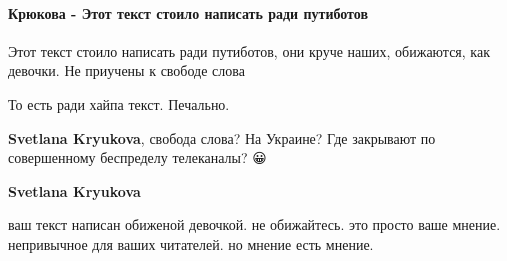  
 
 
 
 
\paragraph{Крюкова - Этот текст стоило написать ради путиботов}
\label{sec:14_07_2021.fb.krjukova_svetlana.1.statja_putina_mnenie.cmt.krjukova_putiboty}

\begin{itemize}
 
Этот текст стоило написать ради путиботов, они круче наших, обижаются, как девочки. Не приучены к свободе слова

\begin{itemize}
 
То есть ради хайпа текст. Печально.

 
\textbf{Svetlana Kryukova}, свобода слова? На Украине? Где закрывают по совершенному беспределу телеканалы? 😀

 
\textbf{Svetlana Kryukova} 

ваш текст написан обиженой девочкой. не обижайтесь. это просто ваше мнение. непривычное для ваших читателей. но мнение есть мнение.



\end{itemize}
\end{itemize}

